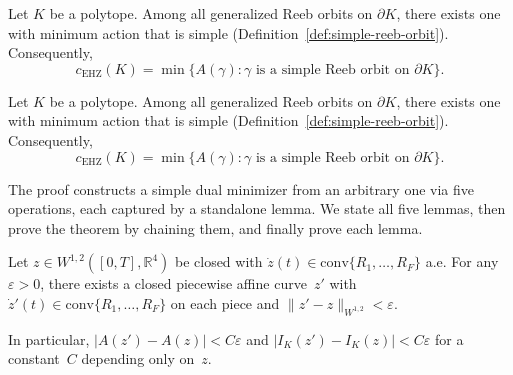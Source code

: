 \begin{theorem}\label{thm:simple-minimizer}
Let $K$ be a polytope.
Among all generalized Reeb orbits on $\partial K$, there exists one
with minimum action that is simple
(Definition~\ref{def:simple-reeb-orbit}).
Consequently,
\[
  c_{\mathrm{EHZ}}(K) = \min\bigl\{ A(\gamma) :
  \gamma \text{ is a simple Reeb orbit on } \partial K \bigr\}.
\]
\end{theorem}



\begin{theorem*}
Let $K$ be a polytope.
Among all generalized Reeb orbits on $\partial K$, there exists one
with minimum action that is simple
(Definition~\ref{def:simple-reeb-orbit}).
Consequently,
\[
  c_{\mathrm{EHZ}}(K) = \min\bigl\{ A(\gamma) :
  \gamma \text{ is a simple Reeb orbit on } \partial K \bigr\}.
\]
\end{theorem*}

The proof constructs a simple dual minimizer from an arbitrary one
via five operations, each captured by a standalone lemma.
We state all five lemmas, then prove the theorem by chaining them,
and finally prove each lemma.


\begin{lemma}\label{lem:pw-affine-approx}
Let $z \in W^{1,2}([0,T], \mathbb{R}^4)$ be closed
with $\dot{z}(t) \in \mathrm{conv}\{R_1, \ldots, R_F\}$ a.e.
For any $\varepsilon > 0$, there exists a closed
piecewise affine curve~$z'$ with
$\dot{z}'(t) \in \mathrm{conv}\{R_1, \ldots, R_F\}$ on each piece
and $\|z' - z\|_{W^{1,2}} < \varepsilon$.

In particular,
$|A(z') - A(z)| < C\varepsilon$ and
$|I_K(z') - I_K(z)| < C\varepsilon$
for a constant~$C$ depending only on~$z$.
\end{lemma}

